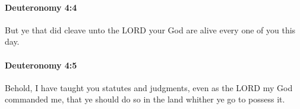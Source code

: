 		\paragraph{Deuteronomy 4:4} %
			\label{DEUTERONOMY-4-4}

			But ye that did cleave unto the LORD your God are alive every one of you this day.


		\paragraph{Deuteronomy 4:5} %
			\label{DEUTERONOMY-4-5}

			Behold, I have taught you statutes and judgments, even as the LORD my God commanded me, that ye should do so in the land whither ye go to possess it.


